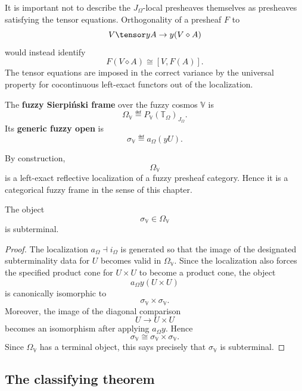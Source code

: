 It is important not to describe the \(J_{\Omega}\)-local presheaves themselves as
presheaves satisfying the tensor equations. Orthogonality of a presheaf \(F\) to
\[
    V\tensor yA\to y(V\diamond A)
\]
would instead identify
\[
    F(V\diamond A)
    \cong
    [V,F(A)].
\]
The tensor equations are imposed in the correct variance by the universal property
for cocontinuous left-exact functors out of the localization.

\begin{definition}
\label{def:fuzzy-sierpinski-frame}
The \textbf{fuzzy Sierpiński frame} over the fuzzy cosmos \(\mathbb V\) is
\[
    \Omega_{\mathbb V}
    \eqdef
    P_{\mathbb V}(\mathbb T_{\Omega})_{J_{\Omega}}.
\]
Its \textbf{generic fuzzy open} is
\[
    \sigma_{\mathbb V}
    \eqdef
    a_{\Omega}(yU).
\]
\end{definition}

By construction,
\[
    \Omega_{\mathbb V}
\]
is a left-exact reflective localization of a fuzzy presheaf category. Hence it is a
categorical fuzzy frame in the sense of this chapter.

\begin{proposition}
\label{prop:generic-fuzzy-open-subterminal}
The object
\[
    \sigma_{\mathbb V}\in\Omega_{\mathbb V}
\]
is subterminal.
\end{proposition}

\begin{proof}
The localization \(a_{\Omega}\dashv i_{\Omega}\) is generated so that the image of
the designated subterminality data for \(U\) becomes valid in
\(\Omega_{\mathbb V}\). Since the localization also forces the specified product cone
for \(U\times U\) to become a product cone, the object
\[
    a_{\Omega}y(U\times U)
\]
is canonically isomorphic to
\[
    \sigma_{\mathbb V}\times\sigma_{\mathbb V}.
\]
Moreover, the image of the diagonal comparison
\[
    U\to U\times U
\]
becomes an isomorphism after applying \(a_{\Omega}y\). Hence
\[
    \sigma_{\mathbb V}
    \cong
    \sigma_{\mathbb V}\times\sigma_{\mathbb V}.
\]
Since \(\Omega_{\mathbb V}\) has a terminal object, this says precisely that
\(\sigma_{\mathbb V}\) is subterminal.
\end{proof}

\subsection{The classifying theorem}
\label{subsec:sierpinski-classifying-theorem}

